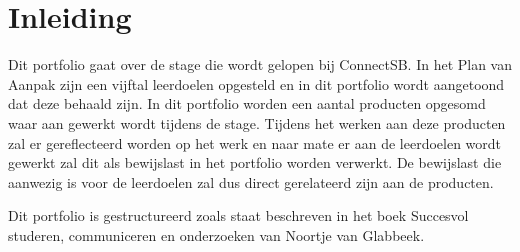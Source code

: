 \setcounter{page}{1}

\section{Inleiding}
Dit portfolio gaat over de stage die wordt gelopen bij ConnectSB. In het Plan van Aanpak zijn een vijftal leerdoelen opgesteld en in dit portfolio wordt aangetoond dat deze behaald zijn.
\newline
In dit portfolio worden een aantal producten opgesomd waar aan gewerkt wordt tijdens de stage. Tijdens het werken aan deze producten zal er gereflecteerd worden op het werk en naar mate er aan de leerdoelen wordt gewerkt zal dit als bewijslast in het portfolio worden verwerkt. De bewijslast die aanwezig is voor de leerdoelen zal dus direct gerelateerd zijn aan de producten.

Dit portfolio is gestructureerd zoals staat beschreven in het boek Succesvol studeren, communiceren en onderzoeken van Noortje van Glabbeek\cite{portfolioboek}.
\clearpage